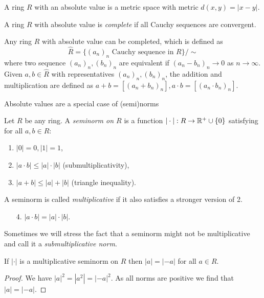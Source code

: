 \begin{proposition}
	A ring $R$ with an absolute value is a metric space with metric $d(x, y) = |x - y|$. 
\end{proposition}
\begin{definition}
	A ring $R$ with absolute value is \emph{complete} if all Cauchy sequences are convergent. 
\end{definition}
\begin{definition}
	Any ring $R$ with absolute value can be completed, which is defined as \[
		\widehat{R} = \{(a_n)_n \text{ Cauchy sequence in } R\} / \sim
	\] 
	where two sequence $(a_n)_n, (b_n)_n$ are equivalent if $(a_n - b_n)_n \to 0$ as $n \to \infty$.
	Given  $a, b \in \widehat{R}$ with representatives $(a_n)_n, (b_n)_n$, the addition and multiplication are defined as $a + b = [(a_n + b_n)_n], a\cdot b = [(a_n \cdot b_n)_n]$. 
\end{definition}

Absolute values are a special case of (semi)norms
\begin{definition}
	Let $R$ be any ring. A \emph{seminorm on $R$} is a function $|\cdot |: R \to \mathbb{R}^{+} \cup \{0\} $ satisfying for all $a, b \in R$:
	\begin{enumerate}
		\item $|0| = 0, |1| = 1$,
		\item $|a \cdot b| \le |a| \cdot |b|$  (submultiplicativity),
		\item $|a + b| \le |a| + |b|$ (triangle inequality).
	\end{enumerate}
	A seminorm is called \emph{multiplicative} if it also satisfies a stronger version of 2. 
	\begin{enumerate}
		\item [4.]  $|a \cdot  b| = |a| \cdot |b|$.
	\end{enumerate}
\end{definition}
Sometimes we will stress the fact that a seminorm might not be multiplicative and call it a \emph{submultiplicative norm}. 

\begin{lemma}
	If $|\cdot |$ is a multiplicative seminorm on $R$ then  $|a | = |-a|$ for all $a \in R$. 
\end{lemma}
\begin{proof}
	We have $|a|^2 = |a^2| = |-a|^2$. As all norms are positive we find that $|a| = |-a|$. 
\end{proof}


